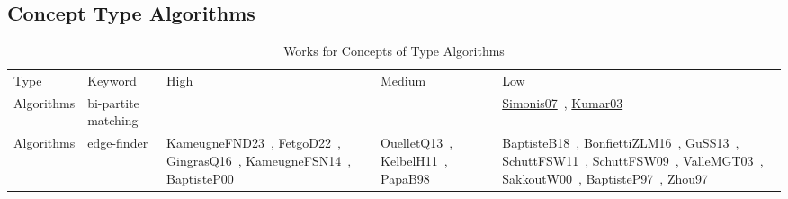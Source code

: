 \clearpage
\subsection{Concept Type Algorithms}
\label{sec:Algorithms}
{\scriptsize
\begin{longtable}{lp{3cm}>{\raggedright\arraybackslash}p{6cm}>{\raggedright\arraybackslash}p{6cm}>{\raggedright\arraybackslash}p{8cm}}
\rowcolor{white}\caption{Works for Concepts of Type Algorithms}\\ \toprule
\rowcolor{white}Type & Keyword & High & Medium & Low\\ \midrule\endhead
\bottomrule
\endfoot
Algorithms & bi-partite matching &  &  & \href{works/Simonis07.pdf}{Simonis07}~\cite{Simonis07}, \href{works/Kumar03.pdf}{Kumar03}~\cite{Kumar03}\\
Algorithms & edge-finder & \href{works/KameugneFND23.pdf}{KameugneFND23}~\cite{KameugneFND23}, \href{works/FetgoD22.pdf}{FetgoD22}~\cite{FetgoD22}, \href{works/GingrasQ16.pdf}{GingrasQ16}~\cite{GingrasQ16}, \href{works/KameugneFSN14.pdf}{KameugneFSN14}~\cite{KameugneFSN14}, \href{works/BaptisteP00.pdf}{BaptisteP00}~\cite{BaptisteP00} & \href{works/OuelletQ13.pdf}{OuelletQ13}~\cite{OuelletQ13}, \href{works/KelbelH11.pdf}{KelbelH11}~\cite{KelbelH11}, \href{works/PapaB98.pdf}{PapaB98}~\cite{PapaB98} & \href{works/BaptisteB18.pdf}{BaptisteB18}~\cite{BaptisteB18}, \href{works/BonfiettiZLM16.pdf}{BonfiettiZLM16}~\cite{BonfiettiZLM16}, \href{works/GuSS13.pdf}{GuSS13}~\cite{GuSS13}, \href{works/SchuttFSW11.pdf}{SchuttFSW11}~\cite{SchuttFSW11}, \href{works/SchuttFSW09.pdf}{SchuttFSW09}~\cite{SchuttFSW09}, \href{works/ValleMGT03.pdf}{ValleMGT03}~\cite{ValleMGT03}, \href{works/SakkoutW00.pdf}{SakkoutW00}~\cite{SakkoutW00}, \href{works/BaptisteP97.pdf}{BaptisteP97}~\cite{BaptisteP97}, \href{works/Zhou97.pdf}{Zhou97}~\cite{Zhou97}\\

\end{longtable}}
